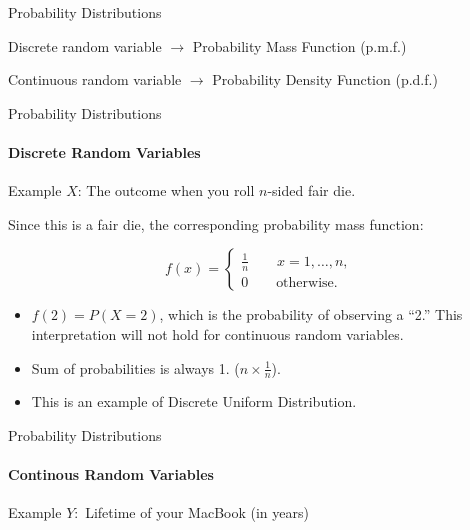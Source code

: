 \documentclass{beamer}\usepackage[]{graphicx}\usepackage[]{color}
\begin{document}
\begin{darkframes}
\begin{frame}[label=lists]{Probability Distributions}
\begin{definition}
       		Discrete random variable $\rightarrow$ Probability Mass Function (p.m.f.)
       		
       		Continuous random variable $\rightarrow$ Probability Density Function (p.d.f.)

      	\end{definition}
    
    
		
  
	\end{frame}  	
	  
  
  




	\begin{frame}[label=lists]{Probability Distributions}
		\framesubtitle{Discrete Random Variables} 
	
		\begin{exampleblock}{Example}
			$X$: The outcome when you roll $n$-sided fair die.
			
			Since this is a fair die, the corresponding probability mass function:
			
			$$ f(x) = 
			\begin{cases}
				\frac{1}{n} \qquad x= 1,\ldots,n, \\
				0 \qquad   \text{otherwise.}
			\end{cases}
			$$
        \end{exampleblock}
        
       
        \begin{itemize}
        	\item $f(2)=P(X=2)$, which is the probability of observing a ``2.'' This interpretation will not hold for continuous random variables.
        	
        	\item Sum of probabilities is always 1. ($n \times \frac{1}{n}$). 
    		
    		\item This is an example of \alert{Discrete Uniform Distribution}.    	
	        	
        \end{itemize} 
	\end{frame}







	\begin{frame}[label=lists]{Probability Distributions}
		\framesubtitle{Continous Random Variables} 
	
		\begin{exampleblock}{Example}
		$Y:$ Lifetime of your MacBook (in years) \newline
		

\end{exampleblock}
\end{frame}
\end{darkframes}
\end{document}
